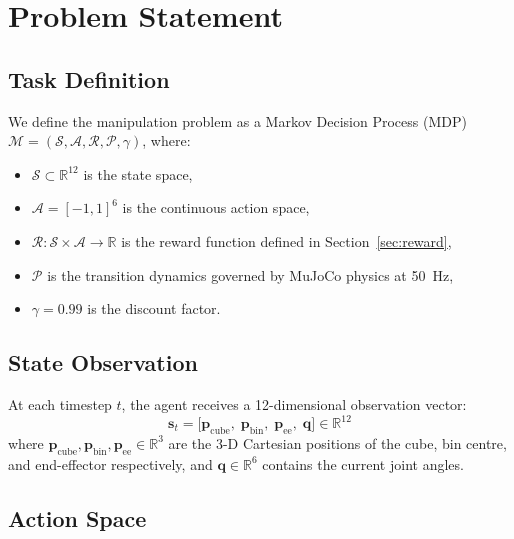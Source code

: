 \documentclass[conference]{IEEEtran}
\begin{document}
\section{Problem Statement}
\label{sec:problem}

\subsection{Task Definition}

We define the manipulation problem as a Markov Decision Process
(MDP) $\mathcal{M} = (\mathcal{S}, \mathcal{A}, \mathcal{R},
\mathcal{P}, \gamma)$, where:

\begin{itemize}
    \item $\mathcal{S} \subset \mathbb{R}^{12}$ is the state space,
    \item $\mathcal{A} = [-1,1]^6$ is the continuous action space,
    \item $\mathcal{R}: \mathcal{S} \times \mathcal{A} \to \mathbb{R}$
          is the reward function defined in Section~\ref{sec:reward},
    \item $\mathcal{P}$ is the transition dynamics governed by
          MuJoCo physics at 50~Hz,
    \item $\gamma = 0.99$ is the discount factor.
\end{itemize}

\subsection{State Observation}

At each timestep $t$, the agent receives a 12-dimensional
observation vector:
\begin{equation}
    \mathbf{s}_t = \bigl[
        \mathbf{p}_\text{cube},\;
        \mathbf{p}_\text{bin},\;
        \mathbf{p}_\text{ee},\;
        \mathbf{q}
    \bigr] \in \mathbb{R}^{12}
    \label{eq:obs}
\end{equation}
where $\mathbf{p}_\text{cube}, \mathbf{p}_\text{bin},
\mathbf{p}_\text{ee} \in \mathbb{R}^3$ are the 3-D Cartesian
positions of the cube, bin centre, and end-effector respectively,
and $\mathbf{q} \in \mathbb{R}^6$ contains the current joint angles.

\subsection{Action Space}
\end{document}
